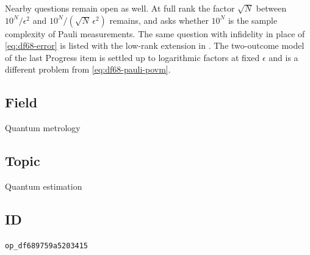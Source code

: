 Nearby questions remain open as well. At full rank the factor $\sqrt N$ between $10^N/\epsilon^2$ and $10^N/(\sqrt N\,\epsilon^2)$ remains, and  asks whether $10^N$ is the sample complexity of Pauli measurements. The same question with infidelity in place of \eqref{eq:df68-error} is listed with the low-rank extension in . The two-outcome model of the last Progress item is settled up to logarithmic factors at fixed $\epsilon$ and is a different problem from \eqref{eq:df68-pauli-povm}.

\subsection*{Field}

Quantum metrology

\subsection*{Topic}

Quantum estimation

\subsection*{ID}

\texttt{op\_df689759a5203415}
